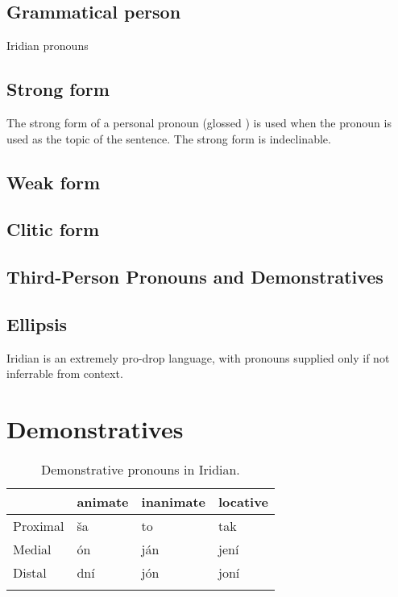 \subsection{Grammatical person}
Iridian pronouns
\subsection{Strong form}

The strong form of a personal pronoun (glossed ) is used when the pronoun is used as the topic of the sentence. The strong form is indeclinable.

\subsection{Weak form}

\subsection{Clitic form}

\subsection{Third-Person Pronouns and Demonstratives}


\subsection{Ellipsis}
Iridian is an extremely pro-drop language, with pronouns supplied only if not inferrable from context.


\section{Demonstratives}

\begin{table}
	\small\centering
	\caption{Demonstrative pronouns in Iridian.}
	\begin{tabu}to 0.7\textwidth{YMMM}
		\toprule
						& {\sc animate}	& {\sc inanimate}	&{\sc locative}\\
		\midrule \addlinespace
		Proximal		& \v{s}a		& to 				& tak\\ \addlinespace
		Medial			& \'on				& j\'an				& jen\'i\\ \addlinespace
		Distal			& dn\'i		& j\'on				& jon\'i\\ \addlinespace
		\bottomrule
		\label{dem-prons}
	\end{tabu}
\end{table}

